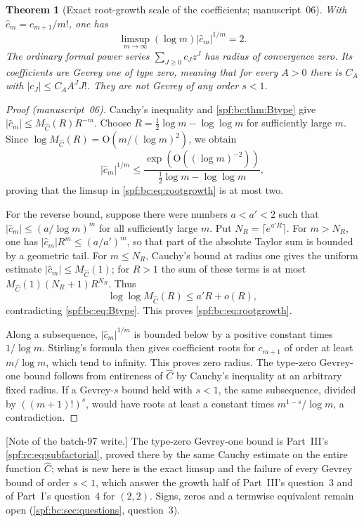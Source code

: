 \documentclass[11pt]{article}
\numberwithin{equation}{section}
\newtheorem{theorem}{Theorem}[section]
\theoremstyle{definition}
\theoremstyle{remark}
\theoremstyle{definition}
\newcommand{\bigO}{\mathrm O}
\begin{document}
\begin{theorem}[Exact root-growth scale of the coefficients; manuscript~06]
\label{spf:bc:thm:coeff-growth}
With $\hat c_m=c_{m+1}/m!$, one has
\begin{equation}
 \boxed{\limsup_{m\to\infty}(\log m)|\hat c_m|^{1/m}=2.}
 \label{spf:bc:eq:rootgrowth}
\end{equation}
The ordinary formal power series $\sum_{J\ge0}c_Jz^J$ has radius of
convergence zero. Its coefficients are Gevrey one of type zero, meaning
that for every $A>0$ there is $C_A$ with $|c_J|\le C_A A^J J!$.
They are not Gevrey of any order $s<1$.
\end{theorem}
\begin{proof}[Proof (manuscript~06)]
Cauchy's inequality and \cref{spf:bc:thm:Btype} give
$|\hat c_m|\le M_{\widehat C}(R)R^{-m}$. Choose
$R=\tfrac12\log m-\log\log m$ for sufficiently large $m$. Since
$\log M_{\widehat C}(R)=\bigO(m/(\log m)^2)$, we obtain
\[
 |\hat c_m|^{1/m}\le\frac{\exp(\bigO((\log m)^{-2}))}
                       {\tfrac12\log m-\log\log m},
\]
proving that the limsup in \eqref{spf:bc:eq:rootgrowth} is at most two.

For the reverse bound, suppose there were numbers $a<a'<2$ such that
$|\hat c_m|\le(a/\log m)^m$ for all sufficiently large $m$. Put
$N_R=\lceil e^{a'R}\rceil$. For $m>N_R$, one has
$|\hat c_m|R^m\le(a/a')^m$, so that part of the absolute Taylor sum is bounded
by a geometric tail. For $m\le N_R$, Cauchy's bound at radius one gives the
uniform estimate $|\hat c_m|\le M_{\widehat C}(1)$; for $R>1$ the sum of these terms is
at most $M_{\widehat C}(1)(N_R+1)R^{N_R}$. Thus
\[
 \log\log M_{\widehat C}(R)\le a'R+o(R),
\]
contradicting \eqref{spf:bc:eq:Btype}. This proves \eqref{spf:bc:eq:rootgrowth}.

Along a subsequence, $|\hat c_m|^{1/m}$ is bounded below by a positive constant
times $1/\log m$. Stirling's formula then gives coefficient roots for
$c_{m+1}$ of order at least $m/\log m$, which tend to infinity. This proves
zero radius. The type-zero Gevrey-one bound follows from entireness of
$\widehat C$ by Cauchy's inequality at an arbitrary fixed radius. If a Gevrey-$s$
bound held with $s<1$, the same subsequence, divided by $((m+1)!)^s$, would
have roots at least a constant times $m^{1-s}/\log m$, a contradiction.
\end{proof}

[Note of the batch-97 write.] The type-zero Gevrey-one bound is Part~III's
\eqref{spf:rc:eq:subfactorial}, proved there by the same Cauchy estimate on
the entire function $\widehat C$; what is new here is the exact limsup and
the failure of every Gevrey bound of order $s<1$, which answer the growth half
of Part~III's question~3 and of Part~I's question~4 for $(2,2)$. Signs,
zeros and a termwise equivalent remain open (\cref{spf:bc:sec:questions},
question~3).
\end{document}
